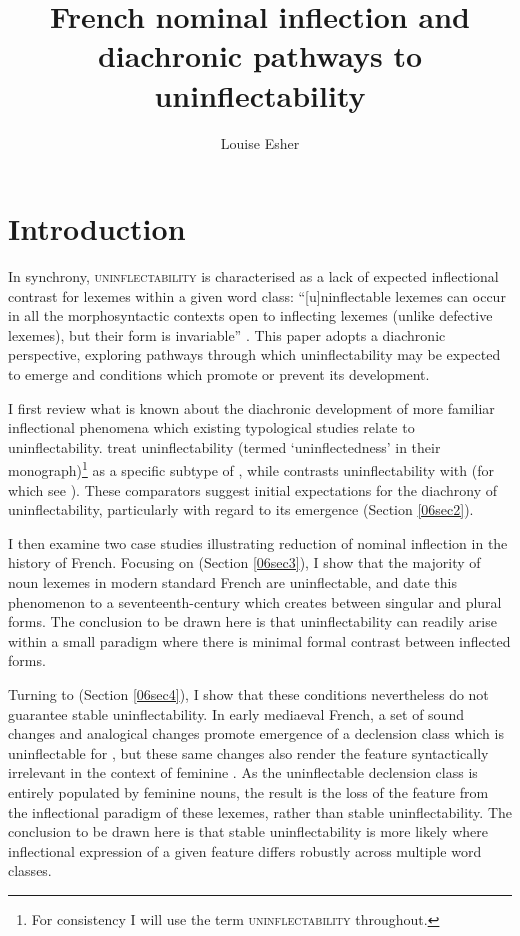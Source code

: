 \documentclass[output=paper,colorlinks,citecolor=brown]{langscibook}
\author{Louise Esher\orcid{}\affiliation{CNRS (Llacan, UMR 8135)}}
\title{French nominal inflection and diachronic pathways to uninflectability}
\begin{document}
\maketitle

\section{Introduction}

In synchrony, \textsc{uninflectability} is characterised as a lack of expected inflectional contrast for lexemes within a given word class: ``[u]ninflectable lexemes can occur in all the morphosyntactic contexts open to inflecting lexemes (unlike defective lexemes), but their form is invariable'' \citep[143]{spencer2020}. This paper adopts a diachronic perspective, exploring pathways through which uninflectability may be expected to emerge and conditions which promote or prevent its development.

I first review what is known about the diachronic development of more familiar inflectional phenomena which existing typological studies relate to uninflectability. \citet{baermanbrowncorbett2005} treat uninflectability (termed `uninflectedness' in their monograph)\footnote{For consistency I will use the term \textsc{uninflectability} throughout.} as a specific subtype of \textsc{}, while \citet{spencer2020} contrasts uninflectability with \textsc{} (for which see \citealt{sims2015}). These comparators suggest initial expectations for the diachrony of uninflectability, particularly with regard to its emergence (Section \ref{06sec2}).

I then examine two case studies illustrating reduction of nominal inflection in the history of French. Focusing on \textsc{} (Section \ref{06sec3}), I show that the majority of noun lexemes in modern standard French are uninflectable, and date this phenomenon to a seventeenth-century  \citep[222--223]{pope1934} which creates  between singular and plural forms. The conclusion to be drawn here is that uninflectability can readily arise within a small paradigm where there is minimal formal contrast between inflected forms.

Turning to \textsc{} (Section \ref{06sec4}), I show that these conditions nevertheless do not guarantee stable uninflectability. In early mediaeval French, a set of sound changes and analogical changes promote emergence of a declension class which is uninflectable for , but these same changes also render the feature \textsc{} syntactically irrelevant in the context of feminine . As the uninflectable declension class is entirely populated by feminine nouns, the result is the loss of the feature \textsc{} from the inflectional paradigm of these lexemes, rather than stable uninflectability. The conclusion to be drawn here is that stable uninflectability is more likely where inflectional expression of a given feature differs robustly across multiple word classes.
\end{document}
